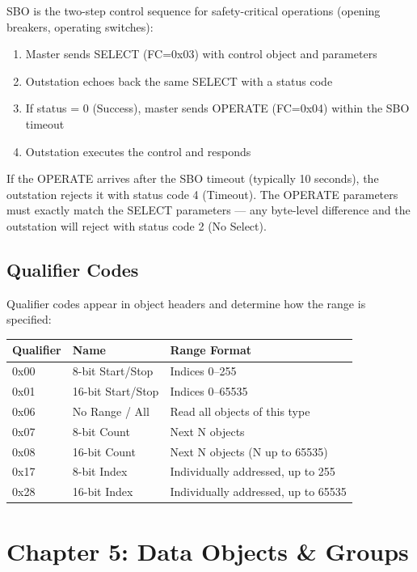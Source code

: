 \documentclass[11pt,twoside]{article}
\begin{document}
SBO is the two-step control sequence for safety-critical operations (opening breakers, operating switches):

\begin{enumerate}[noitemsep]
  \item Master sends SELECT (FC=0x03) with control object and parameters
  \item Outstation echoes back the same SELECT with a status code
  \item If status = 0 (Success), master sends OPERATE (FC=0x04) within the SBO timeout
  \item Outstation executes the control and responds
\end{enumerate}

If the OPERATE arrives after the SBO timeout (typically 10 seconds), the outstation rejects it with status code 4 (Timeout). The OPERATE parameters must exactly match the SELECT parameters --- any byte-level difference and the outstation will reject with status code 2 (No Select).

\subsection{Qualifier Codes}

Qualifier codes appear in object headers and determine how the range is specified:

\begin{tabularx}{\textwidth}{llX}
\toprule
\textbf{Qualifier} & \textbf{Name} & \textbf{Range Format} \\
\midrule
0x00 & 8-bit Start/Stop & Indices 0--255 \\
0x01 & 16-bit Start/Stop & Indices 0--65535 \\
0x06 & No Range / All & Read all objects of this type \\
0x07 & 8-bit Count & Next N objects \\
0x08 & 16-bit Count & Next N objects (N up to 65535) \\
0x17 & 8-bit Index & Individually addressed, up to 255 \\
0x28 & 16-bit Index & Individually addressed, up to 65535 \\
\bottomrule
\end{tabularx}

\section{Chapter 5: Data Objects \& Groups}
\end{document}
